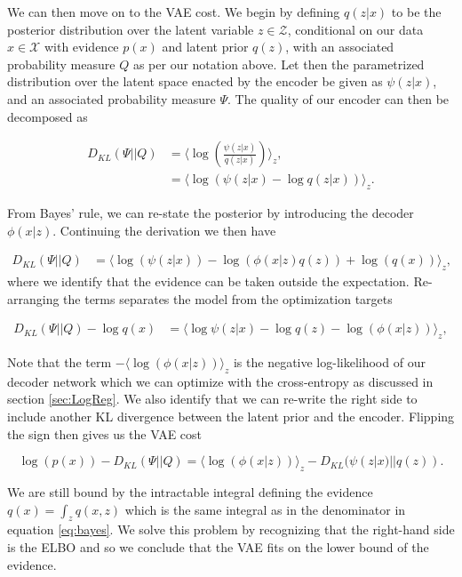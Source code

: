  We can then move on to the VAE cost. We begin by defining $q(z|x)$ to be the posterior distribution over the latent variable $z \in \mathcal{Z}$, conditional on our data $x \in \mathcal{X}$ with evidence $p(x)$ and latent prior $q(z)$, with an associated probability measure $Q$ as per our notation above. Let then the parametrized distribution over the latent space enacted by the encoder be given as $\psi(z|x)$, and an associated probability measure $\Psi$. The quality of our encoder can then be decomposed as 

\begin{align}
D_{KL}(\Psi || Q ) &= \langle \log \left(\frac{\psi(z|x)}{q(z|x)}\right) \rangle_z, \\
&= \langle \log \left(\psi(z|x)- \log q(z|x)\right) \rangle_z.
\end{align}

\noindent From Bayes' rule, we can re-state the posterior by introducing the decoder $\phi(x|z)$. Continuing the derivation we then have 

\begin{align}
D_{KL}(\Psi || Q ) &=  \langle \log \left( \psi(z|x)\right)  - \log \left( \phi( x | z) q(z) \right) + \log (q(x))\rangle_z, 
\end{align}
\noindent where we identify that the evidence can be taken outside the expectation. Re-arranging the terms separates the model from the optimization targets 

\begin{align}
D_{KL}(\Psi || Q ) - \log q(x) &=  \langle \log \psi(z|x) - \log q(z) - \log \left( \phi( x | z)\right) \rangle_z, 
\end{align}

\noindent Note that the term $-\langle \log \left( \phi( x | z)\right) \rangle_z$ is the negative log-likelihood of our decoder network which we can optimize with the cross-entropy as discussed in section \ref{sec:LogReg}. We also identify that we can re-write the right side to include another KL divergence between the latent prior and the encoder. Flipping the sign then gives us the VAE cost

\begin{equation}\label{eq:vae_cost}
\log(p(x)) - D_{KL}(\Psi || Q )=  \langle \log \left( \phi( x | z)\right) \rangle_z - D_{KL}(\psi(z|x)|| q(z)).
\end{equation}
 
\noindent We are still bound by the intractable integral defining the evidence $q(x) = \int_z q(x, z)$ which is the same integral as in the denominator in equation \ref{eq:bayes}. We solve this problem by recognizing that the right-hand side is the ELBO and so we conclude that the VAE fits on the lower bound of the evidence.

